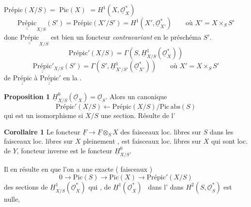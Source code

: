 \documentclass[11pt,a4paper]{article}
\begin{document}
$\text{Prépic}(X/S) =$  $\mathrm{Pic}(X)$ \struck{\ill{}} $= H^{1}(X, \underline{\mathcal{O}}_{X}^{*})$
\[
\underline{\underline{\text{Prépic}}}_{X/S}(S') = \text{Prépic}(X'/S') = H^{1}(X', \underline{\mathcal{O}}_{X'}^{*})
\qquad \text{où } X' = X \times_{S} S'
\]
donc $\underline{\underline{\text{Prépic}}}_{X/S}$ est bien un foncteur \emph{contravariant} en le préschéma $S'$.
\[
\text{Prépic}'(X/S) = \Gamma(S, \underline{H}^{1}_{X/S}(\underline{\mathcal{O}}_{X}^{*}))
\]
\[
\underline{\underline{\text{Prépic}}}'_{X/S}(S') = \Gamma(S', \underline{H}^{1}_{X'/S'}(\underline{\mathcal{O}}_{X'}^{*}))
\qquad \text{où } X' = X \times_{S} S'
\]
 de $\underline{\underline{\text{Prépic}}}$ à $\underline{\underline{\text{Prépic}}}'$ en  la \ill{}  \ill{} \ill{}  \ill{}.

\textbf{Proposition 1}  $\underline{H}^{0}_{X/S}(\underline{\mathcal{O}}_{X}) = \underline{\mathcal{O}}_{S}$. Alors \ill{} un   canonique
\[
\text{Prépic}'(X/S) \leftarrow \text{Prépic}(X/S)/\mathrm{Pic\,abs}(S)
\]
qui est un isomorphisme si $X/S$  une section.
Résulte de l'   \ill{}

\textbf{Corollaire 1} Le foncteur $\underline{F} \to \underline{F} \otimes_{S} X$ des faisceaux loc. libres sur $S$ dans les faisceaux loc. libres sur $X$   pleinement \emph{},  \ill{} \ill{} \ill{} est  \ill{} \ill{} faisceaux loc. libres sur $X$ qui sont  loc. \ill{} \ill{} \ill{} de $Y$, \ill{} foncteur inverse \ill{} \ill{} \ill{} est le foncteur $\underline{H}^{0}_{X/S}$.


Il en résulte en  que l'on a une  exacte (\ill{} \ill{} \ill{} \ill{} \ill{} \ill{} faisceaux )
\[
0 \to \mathrm{Pic}(S) \to \mathrm{Pic}(X) \to \text{Prépic}'(X/S)
\]
    des sections de $\underline{H}^{1}_{X/S}(\underline{\mathcal{O}}_{X}^{*})$ qui \ill{} \ill{},  de $\underline{H}^{1}(\underline{\mathcal{O}}_{X}^{*})$ \ dans l' dans $H^{2}(S, \underline{\mathcal{O}}_{S}^{*})$ est nulle,
\end{document}
